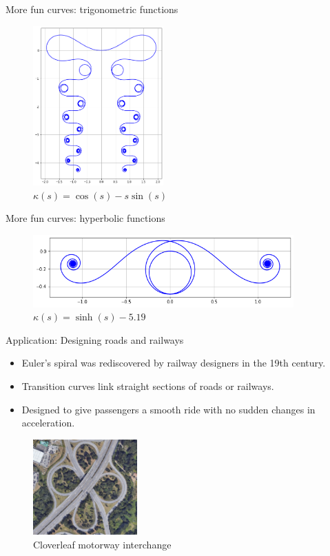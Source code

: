 \documentclass{beamer}
\begin{document}
\begin{frame}{More fun curves: trigonometric functions}
	\begin{figure}
		\caption{$\kappa(s) = \cos(s) - s \sin(s)$}
		\centering
		\includegraphics[width=50mm, scale=0.2]{elegant_madness.png}
	\end{figure}
\end{frame}
	
\begin{frame}{More fun curves: hyperbolic functions}
	\begin{figure}
		\caption{$\kappa(s) = \sinh(s) - 5.19$}
		\centering
		\includegraphics[width=100mm, scale=0.5]{sinh.png}
	\end{figure}
\end{frame}

\begin{frame}{Application: Designing roads and railways}
	\begin{itemize}
		\item Euler's spiral was rediscovered by railway designers in the 19th century.
		\item Transition curves link straight sections of roads or railways.
		\item Designed to give passengers a smooth ride with no sudden changes in acceleration.
	\end{itemize}
	\begin{figure}
		\caption{Cloverleaf motorway interchange}
		\centering
		\includegraphics[width=40mm, scale=0.5]{cloverleaf_motorway.png}
	\end{figure}

\end{frame}
\end{document}
